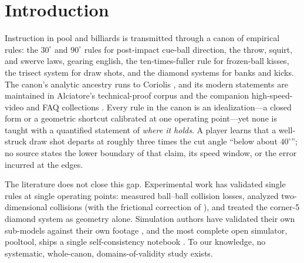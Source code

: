 \section{Introduction}
\label{sec:introduction}

Instruction in pool and billiards is transmitted through a canon of
empirical rules: the $30^\circ$ and $90^\circ$ rules for post-impact
cue-ball direction, the throw, squirt, and swerve laws, gearing english,
the ten-times-fuller rule for frozen-ball kisses, the trisect system for
draw shots, and the diamond systems for banks and kicks. The canon's
analytic ancestry runs to Coriolis
\citep{coriolis1835,nadler2005coriolis}, and its modern statements are
maintained in Alciatore's technical-proof corpus and the companion
high-speed-video and FAQ collections
\citep{alciatore2008coriolis,alciatore_tp_catalog,alciatore_faq}. Every
rule in the canon is an idealization---a closed form or a geometric
shortcut calibrated at one operating point---yet none is taught with a
quantified statement of \emph{where it holds}. A player learns that a
well-struck draw shot departs at roughly three times the cut angle
``below about $40^\circ$''; no source states the lower boundary of that
claim, its speed window, or the error incurred at the edges.

The literature does not close this gap. Experimental work has validated
single rules at single operating points: \citet{bayes1963collision}
measured ball--ball collision losses, \citet{wallace1988billiard}
analyzed two-dimensional collisions (with the frictional correction of
\citealp{onoda1989comment}), and \citet{cohen2002threecushion} treated
the corner-5 diamond system as geometry alone. Simulation authors have
validated their own sub-models against their own footage
\citep{mathavan2010cushion,mathavan2014numerical}, and the most complete
open simulator, pooltool, ships a single self-consistency notebook
\citep{kiefl2024pooltool}. To our knowledge, no systematic, whole-canon,
domains-of-validity study exists.


